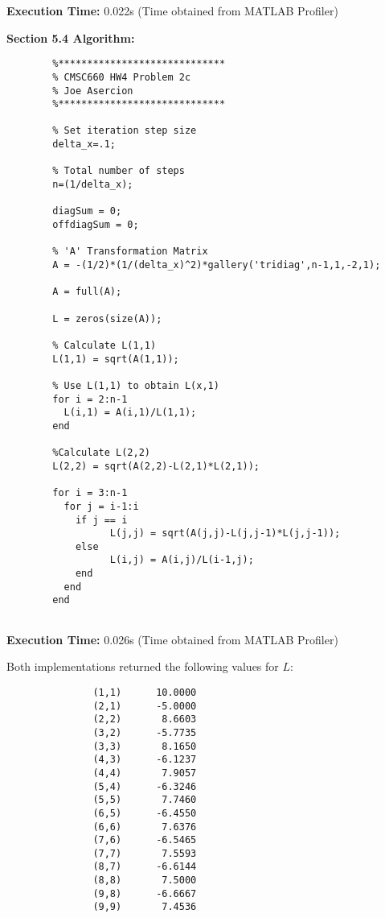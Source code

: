 \documentclass{article}
\newcommand{\n}{\newline}
\begin{document}
		\begin{flushleft}
		\textbf{Execution Time: } 0.022s
		(Time obtained from MATLAB Profiler)
		\end{flushleft}
		
		\newpage
		
		\textbf{Section 5.4 Algorithm: \n}
		
		\begin{lstlisting}
		%*****************************
		% CMSC660 HW4 Problem 2c
		% Joe Asercion
		%***************************** 
		
		% Set iteration step size
		delta_x=.1;
		
		% Total number of steps
		n=(1/delta_x);
		
		diagSum = 0;
		offdiagSum = 0;
		
		% 'A' Transformation Matrix
		A = -(1/2)*(1/(delta_x)^2)*gallery('tridiag',n-1,1,-2,1);
		
		A = full(A);
		
		L = zeros(size(A));
		
		% Calculate L(1,1)
		L(1,1) = sqrt(A(1,1));
		
		% Use L(1,1) to obtain L(x,1)
		for i = 2:n-1
		  L(i,1) = A(i,1)/L(1,1);
		end
		
		%Calculate L(2,2)
		L(2,2) = sqrt(A(2,2)-L(2,1)*L(2,1));
		
		for i = 3:n-1
		  for j = i-1:i
			if j == i
		          L(j,j) = sqrt(A(j,j)-L(j,j-1)*L(j,j-1));
			else
		          L(i,j) = A(i,j)/L(i-1,j);
		    end
		  end
	    end
		
		\end{lstlisting}
		
		\begin{flushleft}
			\textbf{Execution Time: } 0.026s
			(Time obtained from MATLAB Profiler)\n
			
		Both implementations returned the following values for $L$:
		
		\begin{lstlisting}
			   (1,1)      10.0000
			   (2,1)      -5.0000
			   (2,2)       8.6603
			   (3,2)      -5.7735
			   (3,3)       8.1650
			   (4,3)      -6.1237
			   (4,4)       7.9057
			   (5,4)      -6.3246
			   (5,5)       7.7460
			   (6,5)      -6.4550
			   (6,6)       7.6376
			   (7,6)      -6.5465
			   (7,7)       7.5593
			   (8,7)      -6.6144
			   (8,8)       7.5000
			   (9,8)      -6.6667
			   (9,9)       7.4536
		\end{lstlisting}
		
	\end{flushleft}
\end{document}
